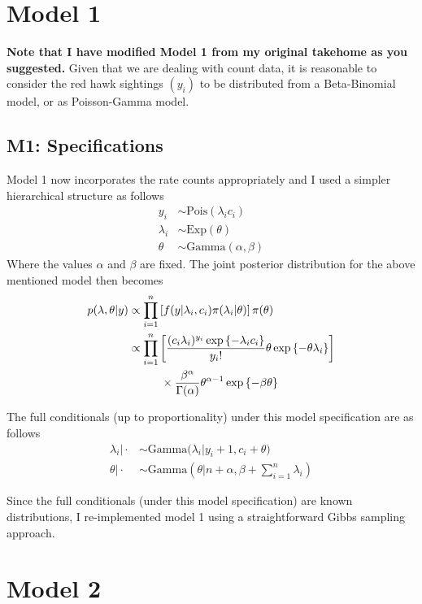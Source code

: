 \documentclass{asaproc}
\newcommand{\prodi}{\prod_{i=1}^n}
\newcommand{\sumi}{\sum_{i=1}^n}
\newcommand\tab[1][1cm]{\hspace*{#1}}
\newcommand{\Pois}{\text{Pois}}
\newcommand{\Gam}{\text{Gamma}}
\begin{document}
\section{Model 1}
\textbf{Note that I have modified Model 1 from my original takehome as you suggested.} Given that we are dealing with count data, it is reasonable to consider the red hawk sightings $(y_i)$ to be distributed from a Beta-Binomial model, or as Poisson-Gamma model. 

\subsection{M1: Specifications}
Model 1 now incorporates the rate counts appropriately and I used a simpler hierarchical structure as follows
\begin{align*}
    y_i &\sim \Pois(\lambda_i c_i)\\
    \lambda_i &\sim \text{Exp}(\theta)\\
    \theta &\sim \Gam(\alpha, \beta) 
\end{align*}
Where the values $\alpha$ and $\beta$ are fixed. The joint posterior distribution for the above mentioned model then becomes
\begin{align*}
    p(\lambda, \theta | y) &\propto \prodi \left[ f(y|\lambda_i, c_i) \pi(\lambda_i|\theta) \right]\pi(\theta)\\
    &\propto \prodi \left[ \frac{(c_i \lambda_i)^{y_i} \exp\left\{-\lambda_i c_i \right\} }{y_i!} \theta \exp\left\{-\theta \lambda_i \right\} \right]\\
    & \tab\times \frac{\beta^\alpha}{\Gamma(\alpha)} \theta^{\alpha -1 }\exp\left\{-\beta\theta \right\}
\end{align*}

The full conditionals (up to proportionality) under this model specification are as follows
\begin{align*}
    \lambda_i\Big|\cdot &\sim \Gam\Big(\lambda_i \Big|y_i + 1, c_i + \theta\Big)\\
    \theta\Big|\cdot &\sim \Gam\left(\theta \Big|n + \alpha, \beta + \sumi \lambda_i \right)
\end{align*}

Since the full conditionals (under this model specification) are known distributions, I re-implemented model 1 using a straightforward Gibbs sampling approach. 

\section{Model 2}
\end{document}

